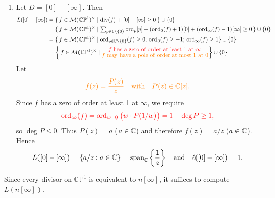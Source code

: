 \documentclass[11pt,openany]{article}
\newcommand{\ord}{\operatorname{ord}}
\newcommand{\CP}{\mathbb{CP}}
\begin{document}
\begin{example}
\begin{enumerate}[(1)]
	\item {\color{blue} Let $D=[0]-[\infty]$.} Then
	\begin{align*}
		L([0]-[\infty])&=\{\,f\in\mathcal M(\mathbb{CP}^1)^\times\mid \operatorname{div}(f)+[0]-[\infty]\ge 0\,\}\cup\{0\}\\
		&=\{\,f\in\mathcal M(\mathbb{CP}^1)^\times\mid \textstyle\sum_{p\in\C\setminus\{0\}}\ord_p[p]+(\ord_0(f)+1)[0]+(\ord_\infty(f)-1)[\infty]\ge 0\,\}\cup\{0\}\\
		&=\{\,f\in\mathcal M(\mathbb{CP}^1)^\times\mid \ord_{p\in\C\setminus\{0\}}(f)\geq 0;\,\ord_0(f)\geq -1; \,\ord_{\infty}(f)\geq 1\}\cup\{0\} \\
		&=\set{\,f\in\mathcal M(\mathbb{CP}^1)^\times\mid \substack{\text{\normalsize\color{red} $f$ has a zero of order at least $1$ at $\infty$}\\ \text{\normalsize\color{orange} $f$ may have a pole of order at most $1$ at $0$}}}\cup\{0\}
	\end{align*}
	Let \[
	\color{orange} f(z)=\frac{P(z)}{z}\quad\text{with}\quad P(z)\in\mathbb{C}[z].
	\]
	Since $f$ has a zero of order at least 1 at $\infty$, we require \[
	\color{red}\ord_{\infty}(f)=\ord_{w=0}\left(w\cdot P(1/w)\right)=1-\deg P\ge 1,
	\] so $\deg P\leq 0$. Thus $P(z)=a$ ($a\in\mathbb{C}$)
	and therefore $f(z)=a/z$ ($a\in\mathbb{C}$). Hence \[
	L([0]-[\infty])=\{a/z:a\in\mathbb{C}\}=\operatorname{span}_{\mathbb{C}}\left\{\frac{1}{z}\right\}
	\quad\text{and}\quad
	\ell([0]-[\infty])=1.
	\]
\end{enumerate}
\end{example}

\newpage
\begin{note}
	Since every divisor on $\CP^1$ is equivalent to $n[\infty]$, it suffices to compute $L(n[\infty])$.
\end{note}
\end{document}
